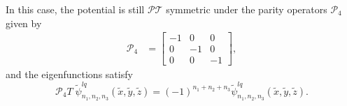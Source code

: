 \documentclass[a4paper, 12pt]{article}
\newcommand{\td}[1]{\tilde{#1}}
\begin{document}
\begin{enumerate}
 In this case, the potential is still $\mathcal{PT}$ symmetric
under the parity operators $\mathcal{P}_4$ given by
 \begin{equation}
 \begin{aligned}
 	\mathcal{P}_4&= \begin{bmatrix}
 		-1 & 0 & 0 \\
 		0 & -1 & 0 \\
 		0 & 0 & -1    
 	\end{bmatrix}, 
 \end{aligned}
 \end{equation} 
 and the eigenfunctions satisfy
 \begin{equation}
 \mathcal{P}_4 T\; \td{\psi}^{lq}_{n_1, n_2, n_3}(\td{x}, \td{y}, \td{z})=(-1)^{n_1+n_2+n_3}\td{\psi}^{lq}_{n_1, n_2, n_3}(\td{x}, \td{y}, \td{z}). \nonumber
 \end{equation} 
\end{enumerate}
\end{document}
